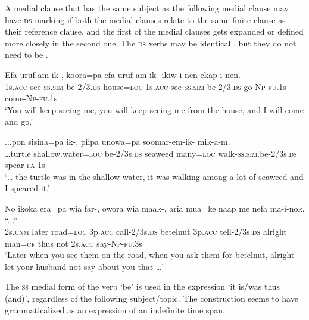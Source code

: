 A medial clause that has the same subject as the following medial clause may have \textsc{ds} marking if both the medial clauses relate to the same finite clause as their reference clause, and the first of the medial clauses gets expanded or defined more closely in the second one. The \textsc{ds} verbs may be identical , but they do not need to be .

\ea%
\label{ex:8:x1494}
\gll Efa  uruf-am-ik-,  koora=pa  efa  uruf-am-ik- ikiw-i-nen  ekap-i-nen.\\
1s.\textsc{acc}  see-\textsc{ss}.\textsc{sim}-be-2/3.\textsc{ds} house=\textsc{loc} 1s.\textsc{acc} see-\textsc{ss}.\textsc{sim}-be-2/3.\textsc{ds} go-\textsc{Np}-\textsc{fu}.1s come-\textsc{Np}-\textsc{fu}.1s    \\
\glt`You will keep seeing me, you will keep seeing me from the house, and I will come and go.'
\z


\ea%
\label{ex:8:x1495}
\gll ...pon  sisina=pa  ik-,  piipa  unowa=pa soomar-em-ik-  mik-a-m. \\
{\dots}turtle  shallow.water=\textsc{loc} be-2/3s.\textsc{ds} seaweed  many=\textsc{loc} walk-\textsc{ss}.\textsc{sim}.be-2/3s.\textsc{ds} spear-\textsc{pa}-1s\\
\glt`{\dots} the turtle was in the shallow water, it was walking among a lot of seaweed and I speared it.'
\z


\ea%
\label{ex:8:x1496}
\gll No  ikoka  era=pa  wia  far-, owora  wia maak-, aria  mua=ke  naap  me  nefa  ma-i-nok,  ``...'' \\
2s.\textsc{unm} later road=\textsc{loc} 3p.\textsc{acc} call-2/3s.\textsc{ds} betelnut 3p.\textsc{acc} tell-2/3s.\textsc{ds} alright man=\textsc{cf} thus  not  2s.\textsc{acc} say-\textsc{Np}-\textsc{fu}.3s\\
\glt`Later when you see them on the road, when you ask them for betelnut, alright let your husband not say about you that {\dots}'
\z


The \textsc{ss} medial form of the verb `be' is used in the expression   `it is/was thus (and)', regardless of the following subject/topic. The construction seems to have grammaticalized as an expression of an indefinite time span.

